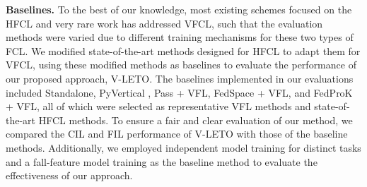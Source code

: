 \noindent\textbf{Baselines.}
To the best of our knowledge, most existing schemes focused on the HFCL and very rare work has addressed VFCL, such that the evaluation methods were varied due to different training mechanisms for these two types of FCL. 
We modified state-of-the-art methods designed for HFCL to adapt them for VFCL, using these modified methods as baselines to evaluate the performance of our proposed approach, V-LETO.
The baselines implemented in our evaluations included Standalone, PyVertical \cite{romanini2021pyvertical}, Pass \cite{zhu2021prototype} + VFL, FedSpace \cite{shenaj2023asynchronous} + VFL, and FedProK \cite{gao2024fedprok} + VFL, all of which were selected as representative VFL methods and state-of-the-art HFCL methods.
To ensure a fair and clear evaluation of our method, we compared the CIL and FIL performance of V-LETO with those of the baseline methods.
Additionally, we employed independent model training for distinct tasks and a fall-feature model training as the baseline method to evaluate the effectiveness of our approach. 







